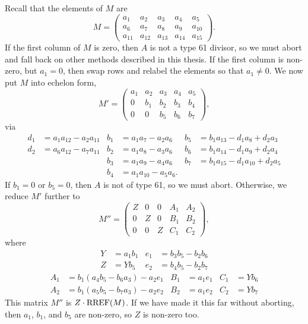 Recall that the elements of $M$ are
\[ M =
\begin{pmatrix}
  a_1 & a_2 & a_3 & a_4 & a_5 \\
  a_6 & a_7 & a_8 & a_9 & a_{10} \\
  a_{11} & a_{12} & a_{13} & a_{14} & a_{15}
\end{pmatrix}. \]
If the first column of $M$ is zero, then $A$ is not a type 61 divisor,
so we must abort and fall back on other methods described in this thesis.
If the first column is non-zero, but $a_1 = 0$, then swap rows and relabel the elements so that $a_1 \neq 0$.
We now put $M$ into echelon form,
\[ M' =
\begin{pmatrix}
  a_1 & a_2 & a_3 & a_4 & a_5 \\
    0 & b_1 & b_2 & b_3 & b_4 \\
    0 &   0 & b_5 & b_6 & b_7
\end{pmatrix}, \]
via
\begin{align*}
  d_1 &= a_1a_{12} - a_2a_{11} & b_1 &= a_1a_7    - a_2a_6 & b_5 &= b_1a_{13} - d_1a_8    + d_2a_3 \\
  d_2 &= a_6a_{12} - a_7a_{11} & b_2 &= a_1a_8    - a_3a_6 & b_6 &= b_1a_{14} - d_1a_9    + d_2a_4 \\
      &                        & b_3 &= a_1a_9    - a_4a_6 & b_7 &= b_1a_{15} - d_1a_{10} + d_2a_5 \\
      &                        & b_4 &= a_1a_{10} - a_5a_6.
\end{align*}
If $b_1 = 0$ or $b_5 = 0$, then $A$ is not of type 61, so we must abort.
Otherwise, we reduce $M'$ further to
\[ M'' =
\begin{pmatrix}
  Z & 0 & 0 & A_1 & A_2 \\
  0 & Z & 0 & B_1 & B_2 \\
  0 & 0 & Z & C_1 & C_2
\end{pmatrix}, \]
where
\begin{align*}
  Y &= a_1b_1 & e_1 &= b_3b_5 - b_2b_6 \\
  Z &= Yb_5   & e_2 &= b_4b_5 - b_2b_7
\end{align*}
\begin{align*}
  A_1 &= b_1(a_4b_5 - b_6a_3) - a_2e_1 & B_1 &= a_1e_1 & C_1 &= Yb_6 \\
  A_2 &= b_1(a_5b_5 - b_7a_3) - a_2e_2 & B_2 &= a_1e_2 & C_2 &= Yb_7
\end{align*}
This matrix $M''$ is $Z \cdot \operatorname{RREF}(M)$.
If we have made it this far without aborting, then $a_1$, $b_1$, and $b_5$ are non-zero, so $Z$ is non-zero too.

